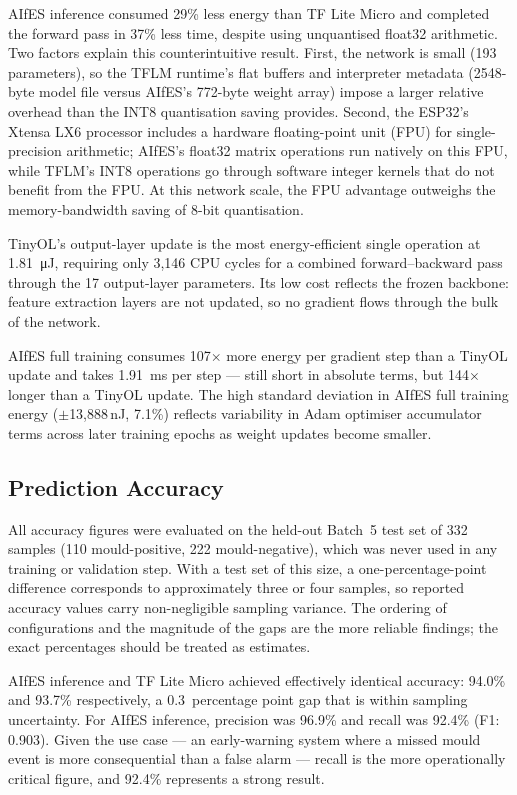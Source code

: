 AIfES inference consumed 29\% less energy than TF Lite Micro and completed the forward pass in 37\% less time, despite using unquantised float32 arithmetic. Two factors explain this counterintuitive result. First, the network is small (193 parameters), so the TFLM runtime's flat buffers and interpreter metadata (2548-byte model file versus AIfES's 772-byte weight array) impose a larger relative overhead than the INT8 quantisation saving provides. Second, the ESP32's Xtensa LX6 processor includes a hardware floating-point unit (FPU) for single-precision arithmetic; AIfES's float32 matrix operations run natively on this FPU, while TFLM's INT8 operations go through software integer kernels that do not benefit from the FPU. At this network scale, the FPU advantage outweighs the memory-bandwidth saving of 8-bit quantisation.

TinyOL's output-layer update is the most energy-efficient single operation at \SI{1.81}{\micro\joule}, requiring only 3,146 CPU cycles for a combined forward--backward pass through the 17 output-layer parameters. Its low cost reflects the frozen backbone: feature extraction layers are not updated, so no gradient flows through the bulk of the network.

AIfES full training consumes 107$\times$ more energy per gradient step than a TinyOL update and takes \SI{1.91}{\milli\second} per step --- still short in absolute terms, but 144$\times$ longer than a TinyOL update. The high standard deviation in AIfES full training energy ($\pm$13,888\,nJ, 7.1\%) reflects variability in Adam optimiser accumulator terms across later training epochs as weight updates become smaller.

\subsection{Prediction Accuracy}\label{subsec:res_accuracy}

All accuracy figures were evaluated on the held-out Batch~5 test set of 332 samples (110 mould-positive, 222 mould-negative), which was never used in any training or validation step. With a test set of this size, a one-percentage-point difference corresponds to approximately three or four samples, so reported accuracy values carry non-negligible sampling variance. The ordering of configurations and the magnitude of the gaps are the more reliable findings; the exact percentages should be treated as estimates.

AIfES inference and TF Lite Micro achieved effectively identical accuracy: 94.0\% and 93.7\% respectively, a 0.3~percentage point gap that is within sampling uncertainty. For AIfES inference, precision was 96.9\% and recall was 92.4\% (F1: 0.903). Given the use case --- an early-warning system where a missed mould event is more consequential than a false alarm --- recall is the more operationally critical figure, and 92.4\% represents a strong result.

